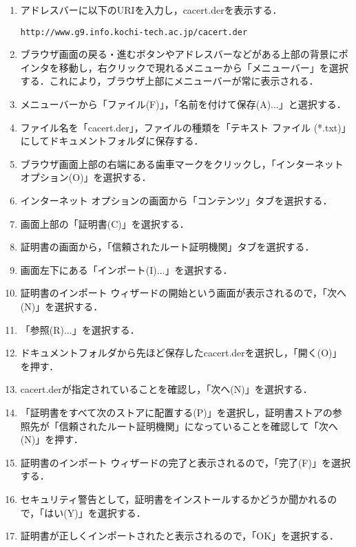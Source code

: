\documentclass[a4j,titlepage]{jarticle}
\begin{document}
\begin{enumerate}
\item アドレスバーに以下のURIを入力し，cacert.derを表示する．
\begin{screen}
\begin{center}
\begin{verbatim}
http://www.g9.info.kochi-tech.ac.jp/cacert.der
\end{verbatim}
\end{center}
\end{screen}

\item ブラウザ画面の戻る・進むボタンやアドレスバーなどがある上部の背景にポインタを移動し，右クリックで現れるメニューから「メニューバー」を選択する．これにより，ブラウザ上部にメニューバーが常に表示される．

\item メニューバーから「ファイル(F)」，「名前を付けて保存(A)...」と選択する．

\item ファイル名を「cacert.der」，ファイルの種類を「テキスト ファイル (*.txt)」にしてドキュメントフォルダに保存する．

\item ブラウザ画面上部の右端にある歯車マークをクリックし，「インターネット オプション(O)」を選択する．

\item インターネット オプションの画面から「コンテンツ」タブを選択する．

\item 画面上部の「証明書(C)」を選択する．

\item 証明書の画面から，「信頼されたルート証明機関」タブを選択する．

\item 画面左下にある「インポート(I)...」を選択する．

\item 証明書のインポート ウィザードの開始という画面が表示されるので，「次へ(N)」を選択する．

\item 「参照(R)...」を選択する．

\item ドキュメントフォルダから先ほど保存したcacert.derを選択し，「開く(O)」を押す．

\item cacert.derが指定されていることを確認し，「次へ(N)」を選択する．

\item 「証明書をすべて次のストアに配置する(P)」を選択し，証明書ストアの参照先が「信頼されたルート証明機関」になっていることを確認して「次へ(N)」を押す．

\item 証明書のインポート ウィザードの完了と表示されるので，「完了(F)」を選択する．

\item セキュリティ警告として，証明書をインストールするかどうか聞かれるので，「はい(Y)」を選択する．

\item 証明書が正しくインポートされたと表示されるので，「OK」を選択する．

\end{enumerate}
\end{document}
